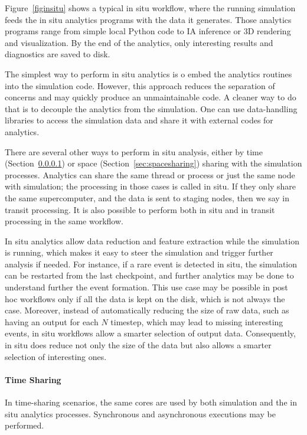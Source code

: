 Figure~\ref{figinsitu} shows a typical in situ workflow, where the running simulation feeds the in situ analytics programs with the data it generates. Those analytics programs range from simple local Python code to IA inference or 3D rendering and visualization. By the end of the analytics, only interesting results and diagnostics are saved to disk. 

The simplest way to perform in situ analytics is o embed the analytics routines into the simulation code. However, this approach reduces the separation of concerns and may quickly produce an unmaintainable code. A cleaner way to do that is to decouple the analytics from the simulation. One can use data-handling libraries to access the simulation data and share it with external codes for analytics.   
 
There are several other ways to perform in situ analysis, either by time (Section~\ref{sec:timesharing}) or space (Section~\ref{sec:spacesharing}) sharing with the simulation processes. 
Analytics can share the same thread or process or just the same node with simulation; the processing in those cases is called in situ. If they only share the same supercomputer, and the data is sent to staging nodes, then we say in transit processing. It is also possible to perform both in situ and in transit processing in the same workflow.

In situ analytics allow data reduction and feature extraction while the simulation is running, which makes it easy to steer the simulation and trigger further analysis if needed. For instance, if a rare event is detected in situ, the simulation can be restarted from the last checkpoint, and further analytics may be done to understand further the event formation. This use case may be possible in post hoc workflows only if all the data is kept on the disk, which is not always the case. 
Moreover, instead of automatically reducing the size of raw data, such as having an output for each $N$ timestep, which may lead to missing interesting events, in situ workflows allow a smarter selection of output data. Consequently, in situ does reduce not only the size of the data but also allows a smarter selection of interesting ones.



\paragraph{Time Sharing}\label{sec:timesharing}

In time-sharing scenarios, the same cores are used by both simulation and the in situ analytics processes. Synchronous and asynchronous executions may be performed. 

